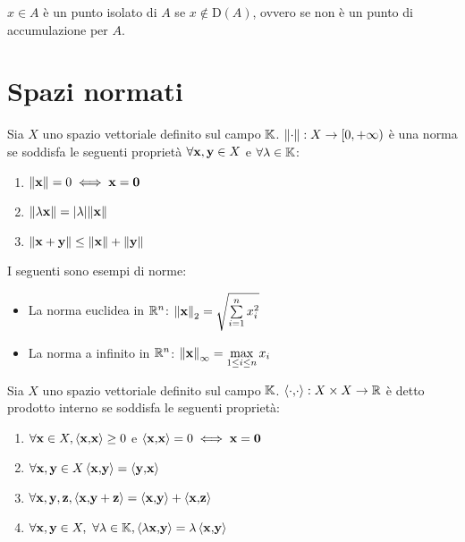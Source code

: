 \begin{definition}
    $x \in A$ è un punto isolato di $A$ se $x \notin \text{D}(A)$, ovvero se non è un punto di accumulazione per $A$.
\end{definition}

\section{Spazi normati}

\begin{definition}
    [Norma]
    Sia $X$ uno spazio vettoriale definito sul campo $\mathbb{K}$. $\norm{\cdot} : X \to [0, +\infty)$ è una norma se soddisfa le seguenti proprietà $\forall \vb{x},\vb{y} \in X$ e $\forall \lambda \in \mathbb{K}$:
    \begin{enumerate}
        \item $\norm{\vb{x}} = 0 \iff \vb{x} = \vb{0}$
        \item $\norm{\lambda \vb{x}} = \abs{\lambda}\norm{\vb{x}}$
        \item $\norm{\vb{x} + \vb{y}} \leq \norm{\vb{x}} + \norm{\vb{y}}$
    \end{enumerate}
    I seguenti sono esempi di norme:
    \begin{itemize}
        \item La norma euclidea in $\mathbb{R}^n$: $\norm{\vb{x}}_2=\sqrt{\sum\limits_{i=1}^nx_i^2}$
        \item La norma a infinito in $\mathbb{R}^n$: $\norm{\vb{x}}_\infty = \max\limits_{1 \leq i \leq n}x_i$
    \end{itemize}
\end{definition}

\begin{definition}
    Sia $X$ uno spazio vettoriale definito sul campo $\mathbb{K}$. $\left\langle\cdot{,}\cdot\right\rangle: X \times X \to \mathbb{R}$ è detto prodotto interno se soddisfa le seguenti proprietà:
    \begin{enumerate}
        \item $\forall \vb{x} \in X, \left\langle\vb{x}{,}\vb{x}\right\rangle \geq 0$ e $\left\langle\vb{x}{,}\vb{x}\right\rangle = 0 \iff \vb{x} = \vb{0}$
        \item $\forall \vb{x}, \vb{y} \in X \left\langle\vb{x}{,}\vb{y}\right\rangle=\left\langle\vb{y}{,}\vb{x}\right\rangle$
        \item $\forall \vb{x}, \vb{y}, \vb{z}, \left\langle\vb{x}{,}\vb{y}+\vb{z}\right\rangle=\left\langle\vb{x}{,}\vb{y}\right\rangle + \left\langle\vb{x}{,}\vb{z}\right\rangle$
        \item $\forall \vb{x}, \vb{y} \in X, \ \forall \lambda \in \K, \ip{\lambda \vb{x}}{\vb{y}} = \lambda \ip{\vb{x}}{\vb{y}} $
    \end{enumerate}
\end{definition}


